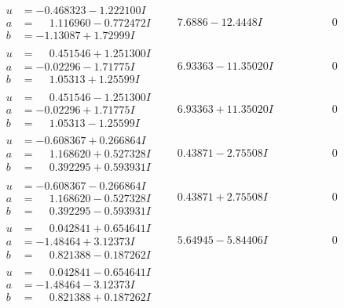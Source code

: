 \documentclass[1p]{elsarticle_modified}
\theoremstyle{definition}
\begin{document}
$$\begin{array}{c|c|c}
\begin{aligned}
u &= -0.468323 - 1.222100 I \\
a &= \phantom{-}1.116960 - 0.772472 I \\
b &= -1.13087 + 1.72999 I\end{aligned}
 & \phantom{-}7.6886 - 12.4448 I & \phantom{-0.000000 } 0 \\ \hline\begin{aligned}
u &= \phantom{-}0.451546 + 1.251300 I \\
a &= -0.02296 - 1.71775 I \\
b &= \phantom{-}1.05313 + 1.25599 I\end{aligned}
 & \phantom{-}6.93363 - 11.35020 I & \phantom{-0.000000 } 0 \\ \hline\begin{aligned}
u &= \phantom{-}0.451546 - 1.251300 I \\
a &= -0.02296 + 1.71775 I \\
b &= \phantom{-}1.05313 - 1.25599 I\end{aligned}
 & \phantom{-}6.93363 + 11.35020 I & \phantom{-0.000000 } 0 \\ \hline\begin{aligned}
u &= -0.608367 + 0.266864 I \\
a &= \phantom{-}1.168620 + 0.527328 I \\
b &= \phantom{-}0.392295 + 0.593931 I\end{aligned}
 & \phantom{-}0.43871 - 2.75508 I & \phantom{-0.000000 } 0 \\ \hline\begin{aligned}
u &= -0.608367 - 0.266864 I \\
a &= \phantom{-}1.168620 - 0.527328 I \\
b &= \phantom{-}0.392295 - 0.593931 I\end{aligned}
 & \phantom{-}0.43871 + 2.75508 I & \phantom{-0.000000 } 0 \\ \hline\begin{aligned}
u &= \phantom{-}0.042841 + 0.654641 I \\
a &= -1.48464 + 3.12373 I \\
b &= \phantom{-}0.821388 - 0.187262 I\end{aligned}
 & \phantom{-}5.64945 - 5.84406 I & \phantom{-0.000000 } 0 \\ \hline\begin{aligned}
u &= \phantom{-}0.042841 - 0.654641 I \\
a &= -1.48464 - 3.12373 I \\
b &= \phantom{-}0.821388 + 0.187262 I\end{aligned}

\end{array}$$
\end{document}

